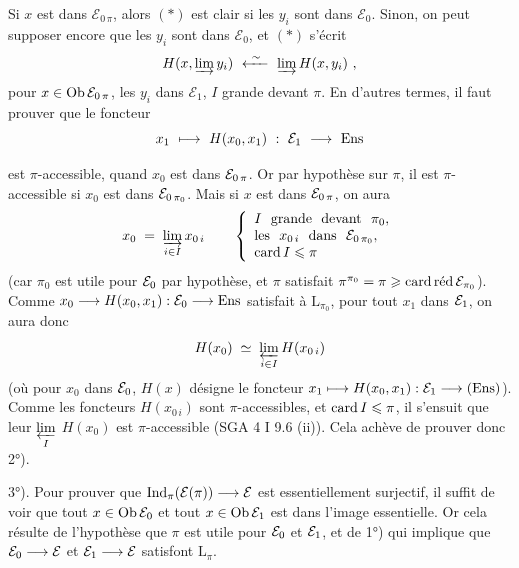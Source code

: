 Si $x$ est dans $\mathcal{E}_{0\,\pi}$, alors $(*)$ est clair si les $y_i$ sont dans $\mathcal{E}_0$. Sinon, on peut supposer encore que les $y_i$ sont dans $\mathcal{E}_0$, et $(*)$ s'écrit %
\[
H(x,\varinjlim y_i)\ \xleftarrow{\ \sim\ }\ \varinjlim H(x,y_i)\ ,
\]
pour $x\in\Ob\mathcal{E}_{0\,\pi}$, les $y_i$ dans $\mathcal{E}_1$, $I$ grande devant $\pi$. En d'autres termes, il faut prouver que le foncteur
\[
x_1\ \longmapsto\ H(x_0,x_1)\ :\ \mathcal{E}_1\ \longrightarrow\ \Ens
\]

\setcounter{footnote}{174}


est $\pi$-accessible, quand $x_0$ est dans $\cE_{0\,\pi}$. Or par hypothèse sur $\pi$, il est $\pi$-accessible si $x_0$ est dans $\cE_{0\,\pi_0}$. Mais si $x$ est dans $\cE_{0\,\pi}$, on aura %
\[
x_0 \;=\; \varinjlim_{i\in I} x_{0\,i} \qquad
\left\{
\begin{array}{l}
I\ \ \text{grande}\ \ \text{devant}\ \ \pi_0,\\
\text{les}\ \ x_{0\,i}\ \ \text{dans}\ \ \cE_{0\,\pi_0},\\
\card I \leqslant \pi
\end{array}
\right.
\]
(car $\pi_0$ est utile pour $\cE_0$ par hypothèse, et $\pi$ satisfait $\pi^{\pi_0} = \pi \geqslant \cardred \cE_{\pi_0}$). Comme $x_0 \longrightarrow H(x_0,x_1) : \cE_0 \longrightarrow \Ens$ satisfait à $\mathrm{L}_{\pi_0}$, pour tout $x_1$ dans $\cE_1$, on aura donc %
\[
H(x_0) \;\simeq\; \varprojlim_{i\in I} H(x_{0\,i})
\]
(où pour $x_0$ dans $\cE_0$, $H(x)$ désigne le foncteur $x_1 \longmapsto H(x_0,x_1) : \cE_1 \longrightarrow (\Ens)$). Comme %
les foncteurs $H(x_{0\,i})$ sont $\pi$-accessibles, et $\card I \leqslant \pi$, il s'ensuit que leur $\varprojlim\limits_{I}$ $H(x_0)$ est $\pi$-accessible (SGA 4 I 9.6 (ii)). Cela achève de prouver donc 2°).

3°). Pour prouver que $\Ind_\pi(\cE(\pi)) \longrightarrow \cE$ est essentiellement surjectif, il suffit de voir que tout $x \in \Ob\cE_0$ et tout $x \in \Ob\cE_1$
est dans l'image essentielle. Or cela résulte de l'hypothèse que $\pi$ est utile pour $\cE_0$ et $\cE_1$, et de 1°) qui implique que $\cE_0 \longrightarrow \cE$ et $\cE_1 \longrightarrow \cE$ satisfont $\mathrm{L}_\pi$.

